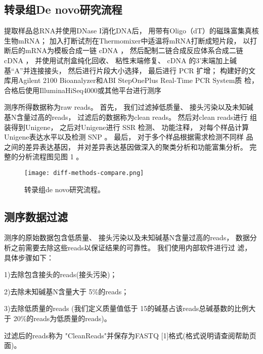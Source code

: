 \documentclass[10pt,oneside,a4paper]{article}	%
\begin{document}
\subsection{转录组De novo研究流程}
提取样品总RNA并使用DNase I消化DNA后， 用带有Oligo（dT）的磁珠富集真核生物mRNA； 加入打断试剂在Thermomixer中适温将mRNA打断成短片段，
以打断后的mRNA为模板合成一链 cDNA ， 然后配制二链合成反应体系合成二链 cDNA ， 并使用试剂盒纯化回收、 粘性末端修复、 cDNA 的3’末端加上碱
基“A”并连接接头， 然后进行片段大小选择， 最后进行 PCR 扩增； 构建好的文库用Agilent 2100 Bioanalyzer和ABI StepOnePlus Real-Time PCR System质
检， 合格后使用IlluminaHiSeq4000或其他平台进行测序
\par
测序所得数据称为raw reads。 首先， 我们过滤掉低质量、 接头污染以及未知碱基N含量过高的reads， 过滤后的数据称为clean reads。 然后对clean reads进行
组装得到Unigene， 之后对Unigene进行 SSR 检测、 功能注释， 对每个样品计算Unigene表达水平以及检测 SNP 。 最后， 对于多个样品根据需求检测不同样
品之间的差异表达基因， 并对差异表达基因做深入的聚类分析和功能富集分析。 完整的分析流程图见图 1 。
\par
\vspace{5mm}

\begin{figure}
\centering
\texttt{[image: diff-methods-compare.png]}
\par
\caption{转录组de novo研究流程。}\label{fig:LengthDis}\par
\end{figure}
\par
\vspace{5 mm}

\subsection{测序数据过滤}
测序的原始数据包含低质量、 接头污染以及未知碱基N含量过高的reads， 数据分析之前需要去除这些reads以保证结果的可靠性。 我们使用内部软件进行过
滤， 具体步骤如下：
\par
1)去除包含接头的reads(接头污染)；\par
2)去除未知碱基N含量大于 5\%的reads； \par
3)去除低质量的reads (我们定义质量值低于 15的碱基占该reads总碱基数的比例大于 20\%的reads为低质量的reads)。\par
过滤后的reads称为 "CleanReads"并保存为FASTQ [1]格式(格式说明请查阅帮助页面)。
\par
\end{document}
